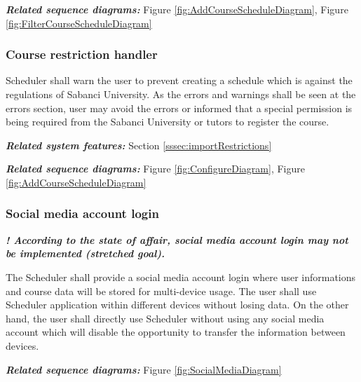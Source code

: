 \documentclass[twoside,letterpaper]{article}
\begin{document}
\smallskip

{\color{black}
\emph{\textbf{Related sequence diagrams:}} Figure \ref{fig:AddCourseScheduleDiagram}, Figure \ref{fig:FilterCourseScheduleDiagram}}

\subsubsection[Course restriction handler]{\rmfamily\bfseries\color{black}
	Course restriction handler}

{\color{black}
	Scheduler shall warn the user to prevent creating a schedule which is against the regulations of Sabanci University. As the errors and warnings shall be seen at the errors section, user may avoid the errors or informed that a special permission is being required from the Sabanci University or tutors to register the course.}
	
\smallskip

{\color{black}
\emph{\textbf{Related system features:}} Section \ref{sssec:importRestrictions}}

\smallskip

{\color{black}
\emph{\textbf{Related sequence diagrams:}} Figure \ref{fig:ConfigureDiagram}, Figure \ref{fig:AddCourseScheduleDiagram}}

\subsubsection[Social media account login
]{\rmfamily\bfseries\color{black}
	Social media account login}

{\noindent{}\color{black}
	\textbf{\emph{! According to the state of affair, social media account login may not be implemented (stretched goal).}}}

\smallskip

{\color{black}
	The Scheduler shall provide a social media account login where user informations and course data will be stored for multi-device usage. The user shall use Scheduler application within different devices without losing data. On the other hand, the user shall directly use Scheduler without using any social media account which will disable the opportunity to transfer the information between devices. }
	
\smallskip

{\color{black}
\emph{\textbf{Related sequence diagrams:}} Figure \ref{fig:SocialMediaDiagram}}
\end{document}

